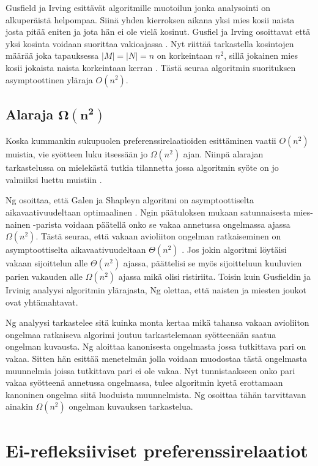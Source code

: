 \documentclass[gradu, twoside]{tktltiki}
\begin{document}
Gusfield ja Irving esittävät algoritmille muotoilun \cite{gusfield89}
jonka analysointi on alkuperäistä helpompaa. Siinä yhden kierroksen
aikana yksi mies kosii naista josta pitää eniten ja jota hän ei ole
vielä kosinut. Gusfiel ja Irving osoittavat että yksi kosinta voidaan
suorittaa vakioajassa \cite{gusfield89}. Nyt riittää tarkastella
kosintojen määrää joka tapauksessa $|M| = |N| = n$ on korkeintaan
$n^2$, sillä jokainen mies kosii jokaista naista korkeintaan kerran
\cite{gusfield89}. Tästä seuraa algoritmin suorituksen asymptoottinen
yläraja $O(n^2)$.

\subsection{Alaraja $\boldsymbol{\Omega(n^2)}$}

Koska kummankin sukupuolen preferenssirelaatioiden esittäminen vaatii
$O(n^2)$ muistia, vie syötteen luku itsessään jo $\Omega(n^2)$ ajan.
Niinpä alarajan tarkastelussa on mielekästä tutkia tilannetta jossa
algoritmin syöte on jo valmiiksi luettu muistiin \cite{cheng89}.

Ng osoittaa, että Galen ja Shapleyn algoritmi on asymptoottiselta
aikavaativuudeltaan optimaalinen \cite{cheng89}. Ngin päätuloksen
mukaan satunnaisesta mies-nainen -parista voidaan päätellä onko se
vakaa annetussa ongelmassa ajassa $\Omega(n^2)$. Tästä seuraa, että
vakaan avioliiton ongelman ratkaiseminen on asymptoottiselta
aikavaativuudeltaan $\Theta(n^2)$ \cite{cheng89}. Jos jokin algoritmi
löytäisi vakaan sijoittelun alle $\Theta(n^2)$ ajassa, päättelisi se
myös sijoitteluun kuuluvien parien vakauden alle $\Omega(n^2)$ ajassa
mikä olisi ristiriita. Toisin kuin Gusfieldin ja Irvinig analyysi
algoritmin ylärajasta, Ng olettaa, että naisten ja miesten joukot ovat
yhtämahtavat.

Ng analyysi tarkastelee sitä kuinka monta kertaa mikä tahansa vakaan
avioliiton ongelmaa ratkaiseva algorimi joutuu tarkastelemaan
syötteenään saatua ongelman kuvausta. Ng aloittaa kanonisesta
ongelmasta jossa tutkittava pari on vakaa. Sitten hän esittää
menetelmän jolla voidaan muodostaa tästä ongelmasta muunnelmia joissa
tutkittava pari ei ole vakaa. Nyt tunnistaakseen onko pari vakaa
syötteenä annetussa ongelmassa, tulee algoritmin kyetä erottamaan
kanoninen ongelma siitä luoduista muunnelmista. Ng osoittaa tähän
tarvittavan ainakin $\Omega(n^2)$ ongelman kuvauksen tarkastelua.
\cite{cheng89}

\section{Ei-refleksiiviset preferenssirelaatiot}
\end{document}
